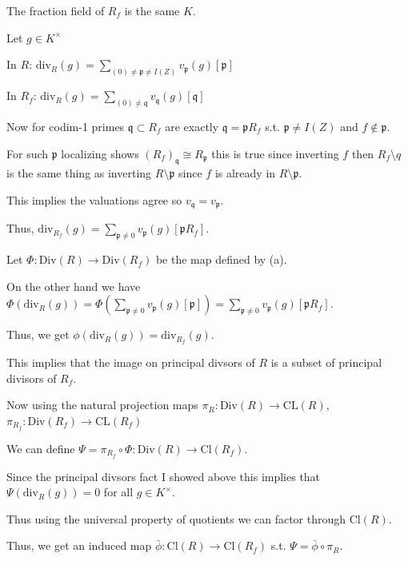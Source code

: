 \documentclass[12pt, letterpaper]{article}
\newcommand{\p}{\mathfrak{p}}
\newcommand{\mf}[1]{\mathfrak{#1}}
\begin{document}
\begin{subproblem}{}
    
\end{subproblem}
\begin{problemproof}
    The fraction field of $R_f$ is the same $K$.

    Let $g \in K^\times$

    In $R$:
    $\mathrm{div}_R(g)=\sum_{(0) \neq \p \neq I(Z)} v_\p(g)[\p]$

    In $R_f$:
    $\mathrm{div}_R(g)=\sum_{(0) \neq \mf{q}} v_\mf{q}(g)[\mf{q}]$

    Now for codim-1 primes $\mf{q} \subset R_f$ are exactly $\mf{q}=\p R_f$ s.t. $\p \neq I(Z)$ and $f \notin \p$.

    For such $\p$ localizing shows $(R_f)_{\mf{q}} \cong R_\p$ this is true since inverting $f$ then $R_f \setminus q$ is the same thing as inverting $R \setminus \p$ since $f$ is already in $R \setminus \p$.

    This implies the valuations agree so $v_\mf{q} = v_\p$.

    Thus, $\mathrm{div}_{R_f}(g) = \sum_{\p \neq 0} v_{\p}(g)[\p R_f]$.

    Let $\Phi : \mathrm{Div}(R) \to \mathrm{Div}(R_f)$ be the map defined by (a).

    On the other hand we have $\Phi(\mathrm{div}_{R}(g)) = \Phi(\sum_{\p \neq 0} v_\p(g)[\p]) = \sum_{\p \neq 0} v_\p(g)[\p R_f]$.

    Thus, we get $\phi(\mathrm{div}_R(g))=\mathrm{div}_{R_f}(g)$.

    This implies that the image on principal divsors of $R$ is a subset of principal divisors of $R_f$.

    Now using the natural projection maps $\pi_R : \mathrm{Div}(R) \to \mathrm{CL}(R)$, $\pi_{R_f} : \mathrm{Div}(R_f) \to \mathrm{CL}(R_f)$

    We can define $\Psi = \pi_{R_f} \circ \Phi : \mathrm{Div}(R) \to \mathrm{Cl}(R_f)$.

    Since the principal divsors fact I showed above this implies that $\Psi(\mathrm{div}_R(g))=0$ for all $g \in K^\times$.

    Thus using the universal property of quotients we can factor through $\mathrm{Cl}(R)$.

    Thus, we get an induced map $\bar{\phi} : \mathrm{Cl}(R) \to \mathrm{Cl}(R_f)$ s.t. $\Psi = \bar{\phi} \circ \pi_R$.
\end{problemproof}
\end{document}
